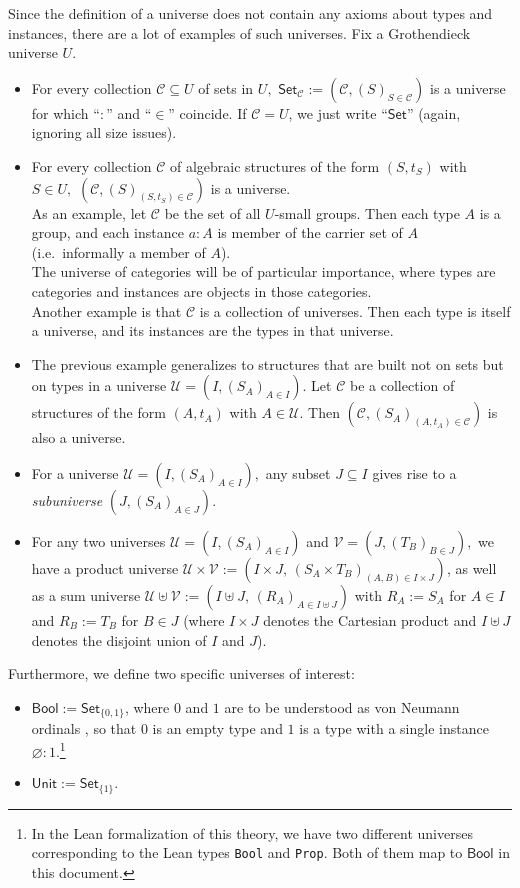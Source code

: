 \documentclass[a4paper]{article}
\theoremstyle{definition}
\theoremstyle{remark}
\newcommand{\defn}{\emph}
\renewcommand{\emptyset}{\varnothing}
\newcommand{\C}{\mathcal{C}}
\newcommand{\U}{\mathcal{U}}
\newcommand{\V}{\mathcal{V}}
\newcommand{\nm}{\mathsf}
\newcommand{\universe}{\nm}
\newcommand{\Unit}{\universe{Unit}}
\newcommand{\Bool}{\universe{Bool}}
\newcommand{\Set}{\universe{Set}}
\newcommand{\Lean}{\texttt}
\begin{document}
Since the definition of a universe does not contain any axioms about types and instances, there
are a lot of examples of such universes. Fix a Grothendieck universe $U.$

\begin{itemize}
  \item For every collection $\C \subseteq U$ of sets in $U,$ $\Set_\C := (\C, (S)_{S \in \C})$ is a
  universe for which ``$:$'' and ``$\in$'' coincide.
  If $\C = U$, we just write ``$\Set$'' (again, ignoring all size issues).
  \item For every collection $\C$ of algebraic structures of the form $(S, t_S)$ with $S \in U,$
  $(\C, (S)_{(S, t_S) \in \C})$ is a universe.\\
  As an example, let $\C$ be the set of all $U$-small groups. Then each type $A$ is a group, and
  each instance $a : A$ is member of the carrier set of $A$ (i.e.\ informally a member of $A$).\\
  The universe of categories will be of particular importance, where types are categories and instances
  are objects in those categories.\\
  Another example is that $\C$ is a collection of universes. Then each type is itself a universe, and
  its instances are the types in that universe.
  \item The previous example generalizes to structures that are built not on sets but on types in a
  universe $\U = (I, (S_A)_{A \in I}).$ Let $\C$ be a collection of structures of the form $(A,t_A)$ with
  $A \in \U$. Then $(\C, (S_A)_{(A, t_A) \in \C})$ is also a universe.
  \item For a universe $\U = (I, (S_A)_{A \in I}),$ any subset $J \subseteq I$ gives rise to a
  \defn{subuniverse} $(J, (S_A)_{A \in J}).$
  \item For any two universes $\U = (I, (S_A)_{A \in I})$ and $\V = (J, (T_B)_{B \in J}),$ we have a
  product universe $\U \times \V := (I{\times}J,\,(S_A{\times}T_B)_{(A,B) \in I{\times}J})$, as well as a
  sum universe $\U \uplus \V := (I \uplus J,\,(R_A)_{A \in I \uplus J})$ with $R_A := S_A$ for $A \in I$
  and $R_B := T_B$ for $B \in J$ (where $I \times J$ denotes the Cartesian product and $I \uplus J$
  denotes the disjoint union of $I$ and $J$).
\end{itemize}

Furthermore, we define two specific universes of interest:
\begin{itemize}
  \item $\Bool := \Set_{\{0, 1\}}$, where $0$ and $1$ are to be understood as von Neumann ordinals
  \cite{von-neumann-ordinals}, so that $0$ is an empty type and $1$ is a type with a single
  instance $\emptyset : 1.$\footnote{In the Lean formalization of this theory, we have two different universes
  corresponding to the Lean types \Lean{Bool} and \Lean{Prop}. Both of them map to $\Bool$ in this document.}
  \item $\Unit := \Set_{\{1\}}.$
\end{itemize}
\end{document}
